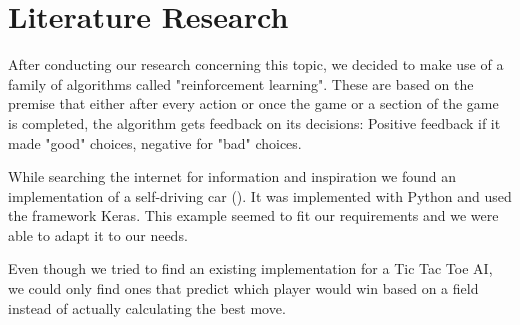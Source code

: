 \section{Literature Research}
After conducting our research concerning this topic, we decided to make use of a family of algorithms called "reinforcement learning". These are based on the premise that either after every action or once the game or a section of the game is completed, the algorithm gets feedback on its decisions: Positive feedback if it made "good" choices, negative for "bad" choices.

While searching the internet for information and inspiration we found an implementation of a self-driving car (\cite{Harvey17}). It was implemented with Python and used the framework Keras. This example seemed to fit our requirements and we were able to adapt it to our needs.

Even though we tried to find an existing implementation for a Tic Tac Toe \ac{AI}, we could only find ones that predict which player would win based on a field instead of actually calculating the best move.

